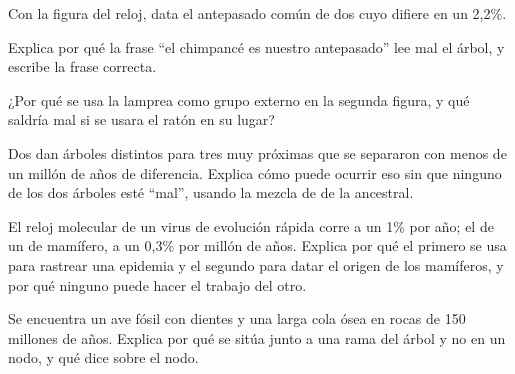 \begin{exercise}[$\star\star$]\label{exo:g12:phylogenetic-trees:9}
Con la figura del reloj, data el antepasado común de dos  cuyo
 difiere en un 2,2\%.
\end{exercise}

\begin{exercise}[$\star\star$]\label{exo:g12:phylogenetic-trees:10}
Explica por qué la frase ``el chimpancé es nuestro antepasado'' lee mal
el árbol, y escribe la frase correcta.
\end{exercise}

\begin{exercise}[$\star\star$]\label{exo:g12:phylogenetic-trees:11}
¿Por qué se usa la lamprea como grupo externo en la segunda figura, y
qué saldría mal si se usara el ratón en su lugar?
\end{exercise}

\begin{exercise}[$\star\star\star$]\label{exo:g12:phylogenetic-trees:12}
Dos  dan árboles distintos para tres  muy próximas que se
separaron con menos de un millón de años de diferencia. Explica cómo
puede ocurrir eso sin que ninguno de los dos árboles esté ``mal'',
usando la mezcla de  de la  ancestral.
\end{exercise}

\begin{exercise}[$\star\star\star$]\label{exo:g12:phylogenetic-trees:13}
El reloj molecular de un virus de evolución rápida corre a un 1\% por
año; el de un  de mamífero, a un 0,3\% por millón de años. Explica
por qué el primero se usa para rastrear una epidemia y el segundo para
datar el origen de los mamíferos, y por qué ninguno puede hacer el
trabajo del otro.
\end{exercise}

\begin{exercise}[$\star\star\star$]\label{exo:g12:phylogenetic-trees:14}
Se encuentra un ave fósil con dientes y una larga cola ósea en rocas de
150 millones de años. Explica por qué se sitúa junto a una rama del
árbol y no en un nodo, y qué dice sobre el nodo.
\end{exercise}

